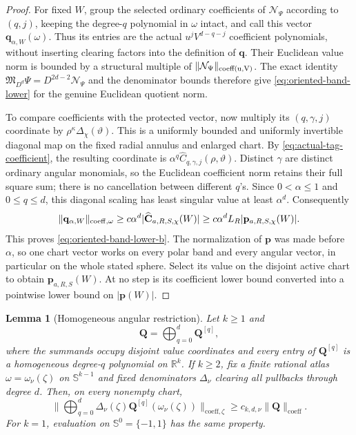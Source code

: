 \documentclass[11pt]{article}
\numberwithin{equation}{section}
\newtheorem{lemma}[theorem]{Lemma}
\theoremstyle{remark}
\theoremstyle{definition}
\newcommand{\R}{\mathbb R}
\newcommand{\Sph}{\mathbb S}
\newcommand{\norm}[1]{\lVert #1\rVert}
\begin{document}
\begin{proof}
For fixed $W$, group the selected ordinary coefficients of
$\mathcal N_\Psi$ according to $(q,j)$, keeping the degree-$q$
polynomial in $\omega$ intact, and call this vector
$\mathbf q_{\alpha,W}(\omega)$.  Thus its entries are the actual
$u^jV^{d-q-j}$ coefficient polynomials, without inserting clearing
factors into the definition of $\mathbf q$.
Their Euclidean value norm is bounded by a structural multiple of
$\|\mathcal N_\Psi\|_{\rm coeff(u,V)}$.  The exact identity
$\mathfrak M_{D^d}\Psi=D^{2d-2}\mathcal N_\Psi$ and the denominator
bounds therefore give \eqref{eq:oriented-band-lower} for the genuine
Euclidean quotient norm.

To compare coefficients with the protected vector, now multiply its
$(q,\gamma,j)$ coordinate by $\rho^\kappa\Delta_\chi(\vartheta)$.
This is a uniformly bounded and uniformly invertible diagonal map on
the fixed radial annulus and enlarged chart.  By
\eqref{eq:actual-tag-coefficient}, the resulting coordinate is
$\alpha^q\widehat C_{q,\gamma,j}(\rho,\vartheta)$.
Distinct $\gamma$ are distinct ordinary angular monomials, so the
Euclidean coefficient norm retains their full square sum; there is
no cancellation between different $q$'s.  Since $0<\alpha\le1$ and
$0\le q\le d$, this diagonal scaling has least singular value at
least $\alpha^d$.  Consequently
\[
 \|\mathbf q_{\alpha,W}\|_{{\rm coeff},\omega}
 \ge c\alpha^d|\widehat{\mathbf C}_{a,R,S,\chi}(W)|
 \ge c\alpha^dL_R|\mathbf p_{a,R,S,\chi}(W)|.
\]
This proves \eqref{eq:oriented-band-lower-b}.  The normalization
of $\mathbf p$ was made before $\alpha$, so one chart vector works on
every polar band and every angular vector, in particular on the whole
stated sphere.  Select its value on the disjoint active chart to obtain
$\mathbf p_{a,R,S}(W)$.  At no step is its coefficient lower bound
converted into a pointwise lower bound on $|\mathbf p(W)|$.
\end{proof}

\begin{lemma}[Homogeneous angular restriction]\label{lem:homogeneous-angular-restriction}
Let $k\ge1$ and
\[
 \mathbf Q=\bigoplus_{q=0}^d\mathbf Q^{[q]},
\]
where the summands occupy disjoint value coordinates and every entry of
$\mathbf Q^{[q]}$ is a homogeneous degree-$q$ polynomial on $\R^k$.
If $k\ge2$, fix a finite rational atlas
$\omega=\omega_\nu(\zeta)$ on $\Sph^{k-1}$ and fixed denominators
$\Delta_\nu$ clearing all pullbacks through degree $d$.  Then, on every
nonempty chart,
\begin{equation}\label{eq:homogeneous-angular-restriction}
 \norm{\bigoplus_{q=0}^d
 \Delta_\nu(\zeta)\mathbf Q^{[q]}(\omega_\nu(\zeta))}
      _{\mathrm{coeff},\zeta}
 \ge c_{k,d,\nu}\norm{\mathbf Q}_{\mathrm{coeff}}.
\end{equation}
For $k=1$, evaluation on $\Sph^0=\{-1,1\}$ has the same property.
\end{lemma}
\end{document}
